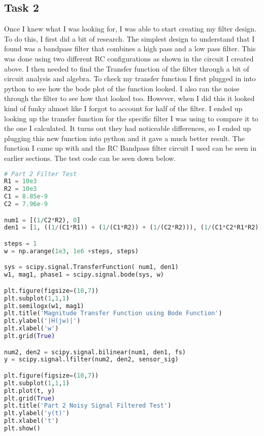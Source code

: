 \documentclass[12pt]{report}
\begin{document}
\subsection{Task 2}
Once I knew what I was looking for, I was able to start creating
my filter design. To do this, I first did a bit of research. The
simplest design to understand that I found was a bandpass filter
that combines a high pass and a low pass filter. This was done using
two different RC configurations as shown in the circuit I created above.
I then needed to find the Transfer function of the filter through
a bit of circuit analysis and algebra. To check my transfer function I
first plugged in into python to see how the bode plot of the function
looked. I also ran the noise through the filter to see how that looked too.
However, when I did this it looked kind of funky almost like I forgot to
account for half of the filter. I ended up looking up the transfer
function for the specific filter I was using to compare it to the
one I calculated. It turns out they had noticeable differences, so
I ended up plugging this new function into python and it gave a much
better result. The function I came up with and the RC Bandpass filter
circuit I used can be seen in earlier sections. The test code can be seen
down below.
\begin{lstlisting}[language=Python]
# Part 2 Filter Test
R1 = 10e3
R2 = 10e3
C1 = 8.85e-9      
C2 = 7.96e-9          

num1 = [(1/C2*R2), 0]
den1 = [1, ((1/(C1*R1)) + (1/(C1*R2)) + (1/(C2*R2))), (1/(C1*C2*R1*R2))]

steps = 1
w = np.arange(1e3, 1e6 +steps, steps)

sys = scipy.signal.TransferFunction( num1, den1)
w1, mag1, phase1 = scipy.signal.bode(sys, w)

plt.figure(figsize=(10,7))
plt.subplot(1,1,1)
plt.semilogx(w1, mag1)
plt.title('Magnitude Transfer Function using Bode Function')                           
plt.ylabel('|H(jw)|')
plt.xlabel('w')
plt.grid(True)

num2, den2 = scipy.signal.bilinear(num1, den1, fs)
y = scipy.signal.lfilter(num2, den2, sensor_sig)

plt.figure(figsize=(10,7))
plt.subplot(1,1,1)
plt.plot(t, y)
plt.grid(True)
plt.title('Part 2 Noisy Signal Filtered Test')                           
plt.ylabel('y(t)')
plt.xlabel('t')
plt.show()
\end{lstlisting}
\end{document}
